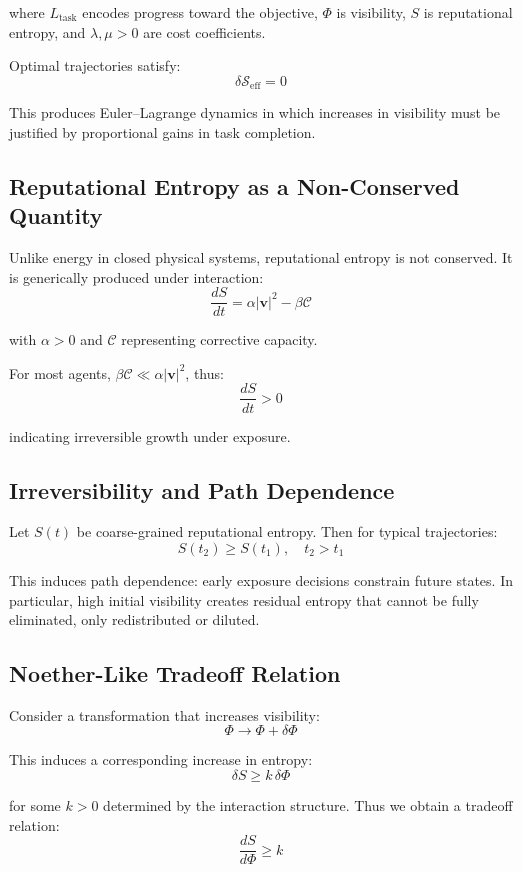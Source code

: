 \documentclass[12pt,a4paper]{article}
\begin{document}
where $L_{\text{task}}$ encodes progress toward the objective, $\Phi$ is visibility, $S$ is reputational entropy, and $\lambda, \mu > 0$ are cost coefficients.

Optimal trajectories satisfy:
\[
\delta \mathcal{S}_{\text{eff}} = 0
\]

This produces Euler--Lagrange dynamics in which increases in visibility must be justified by proportional gains in task completion.

\subsection{Reputational Entropy as a Non-Conserved Quantity}

Unlike energy in closed physical systems, reputational entropy is not conserved. It is generically produced under interaction:
\[
\frac{dS}{dt} = \alpha |\mathbf{v}|^2 - \beta \mathcal{C}
\]

with $\alpha > 0$ and $\mathcal{C}$ representing corrective capacity.

For most agents, $\beta \mathcal{C} \ll \alpha |\mathbf{v}|^2$, thus:
\[
\frac{dS}{dt} > 0
\]

indicating irreversible growth under exposure.

\subsection{Irreversibility and Path Dependence}

Let $S(t)$ be coarse-grained reputational entropy. Then for typical trajectories:
\[
S(t_2) \geq S(t_1), \quad t_2 > t_1
\]

This induces path dependence: early exposure decisions constrain future states. In particular, high initial visibility creates residual entropy that cannot be fully eliminated, only redistributed or diluted.

\subsection{Noether-Like Tradeoff Relation}

Consider a transformation that increases visibility:
\[
\Phi \rightarrow \Phi + \delta \Phi
\]

This induces a corresponding increase in entropy:
\[
\delta S \geq k \, \delta \Phi
\]

for some $k > 0$ determined by the interaction structure. Thus we obtain a tradeoff relation:
\[
\frac{dS}{d\Phi} \geq k
\]
\end{document}
